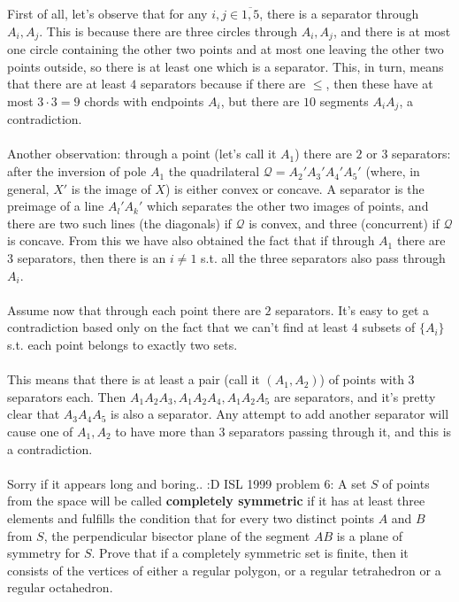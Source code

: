 First of all, let's observe that for any $i,j\in\overline{1,5}$, there is a separator through $A_i,A_j$. This is because there are three circles through $A_i,A_j$, and there is at most one circle containing the other two points and at most one leaving the other two points outside, so there is at least one which is a separator. This, in turn, means that there are at least $4$ separators because if there are $\le$, then these have at most $3\cdot 3=9$ chords with endpoints $A_i$, but there are $10$ segments $A_iA_j$, a contradiction. \\\\
Another observation: through a point (let's call it $A_1$) there are $2$ or $3$ separators: after the inversion of pole $A_1$ the quadrilateral $\mathcal Q=A_2'A_3'A_4'A_5'$ (where, in general, $X'$ is the image of $X$) is either convex or concave. A separator is the preimage of a line $A_l'A_k'$ which separates the other two images of points, and there are two such lines (the diagonals) if $\mathcal Q$ is convex, and three (concurrent) if $\mathcal Q$ is concave. From this we have also obtained the fact that if through $A_1$ there are $3$ separators, then there is an $i\ne 1$ s.t. all the three separators also pass through $A_i$. \\\\
Assume now that through each point there are $2$ separators. It's easy to get a contradiction based only on the fact that we can't find at least $4$ subsets of $\{A_i\}$ s.t. each point belongs to exactly two sets. \\\\
This means that there is at least a pair (call it $(A_1,A_2)$) of points with $3$ separators each. Then $A_1A_2A_3,A_1A_2A_4,A_1A_2A_5$ are separators, and it's pretty clear that $A_3A_4A_5$ is also a separator. Any attempt to add another separator will cause one of $A_1,A_2$ to have more than $3$ separators passing through it, and this is a contradiction. \\\\
Sorry if it appears long and boring.. :D 
ISL 1999 problem 6:  A set $ S$ of points from the space will be called \textbf{completely symmetric} if it has at least three elements and fulfills the condition that for every two distinct points $ A$ and $ B$ from $ S$, the perpendicular bisector plane of the segment $ AB$ is a plane of symmetry for $ S$. Prove that if a completely symmetric set is finite, then it consists of the vertices of either a regular polygon, or a regular tetrahedron or a regular octahedron. 
